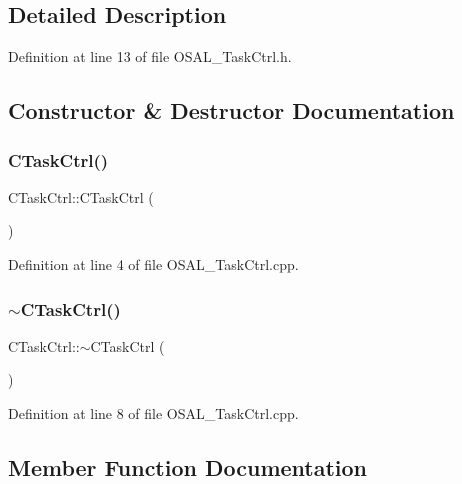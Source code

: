 \subsection{Detailed Description}


Definition at line 13 of file O\+S\+A\+L\+\_\+\+Task\+Ctrl.\+h.



\subsection{Constructor \& Destructor Documentation}
\mbox{\label{class_c_task_ctrl_a4d459479b49c5d6e1d07e9306748abe3}} 
\subsubsection{\texorpdfstring{C\+Task\+Ctrl()}{CTaskCtrl()}}
{\footnotesize\ttfamily C\+Task\+Ctrl\+::\+C\+Task\+Ctrl (\begin{DoxyParamCaption}{ }\end{DoxyParamCaption})}



Definition at line 4 of file O\+S\+A\+L\+\_\+\+Task\+Ctrl.\+cpp.

\mbox{\label{class_c_task_ctrl_a525a2b4438270d4ea5fce41e646c5b17}} 
\subsubsection{\texorpdfstring{$\sim$\+C\+Task\+Ctrl()}{~CTaskCtrl()}}
{\footnotesize\ttfamily C\+Task\+Ctrl\+::$\sim$\+C\+Task\+Ctrl (\begin{DoxyParamCaption}{ }\end{DoxyParamCaption})}



Definition at line 8 of file O\+S\+A\+L\+\_\+\+Task\+Ctrl.\+cpp.



\subsection{Member Function Documentation}
\mbox{\label{class_c_task_ctrl_a12ec6e8d4a490eba9ebdf22d32cf292b}} 
